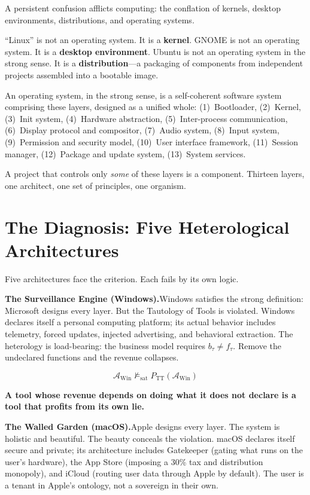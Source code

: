 \documentclass[11pt, oneside]{article}
\newcommand{\verdict}[1]{%
    \vspace{10pt}%
    \begin{center}\textcolor{LogosGold}{\textbf{#1}}\end{center}%
    \vspace{10pt}%
}
\begin{document}
A persistent confusion afflicts computing: the conflation of
kernels, desktop environments, distributions, and operating systems.

``Linux'' is not an operating system. It is a \textbf{kernel}. GNOME is
not an operating system. It is a \textbf{desktop environment}. Ubuntu is
not an operating system in the strong sense. It is a
\textbf{distribution}---a packaging of components from
independent projects assembled into a bootable image.

An operating system, in the strong sense, is a self-coherent
software system comprising these layers, designed as a unified whole: (1)~Bootloader, (2)~Kernel, (3)~Init
system, (4)~Hardware abstraction, (5)~Inter-process communication,
(6)~Display protocol and compositor, (7)~Audio system, (8)~Input system,
(9)~Permission and security model, (10)~User interface framework,
(11)~Session manager, (12)~Package and update system, (13)~System
services.

A project that controls only \textit{some} of these layers is a
component. Thirteen layers, one architect, one set of principles, one
organism.

\section{The Diagnosis: Five Heterological Architectures}

Five architectures face the criterion. Each fails by its own logic.

\medskip
\noindent\textbf{The Surveillance Engine (Windows).}\quad Windows
satisfies the strong definition: Microsoft designs every layer. But the
Tautology of Tools is violated. Windows declares itself a personal computing platform; its actual behavior
includes telemetry, forced updates, injected advertising, and behavioral
extraction. The heterology is load-bearing: the business model
requires $b_\tau \neq f_\tau$. Remove the undeclared functions and the
revenue collapses.

\[
\mathcal{A}_{\mathrm{Win}} \not\models_{\mathrm{sat}}
P_{\mathrm{TT}}(\mathcal{A}_{\mathrm{Win}}) \tag{TT}
\]

\verdict{A tool whose revenue depends on doing what it does not declare
is a tool that profits from its own lie.}

\noindent\textbf{The Walled Garden (macOS).}\quad Apple designs every
layer. The system is holistic and beautiful. The beauty
conceals the violation. macOS declares itself secure and private; its
architecture includes Gatekeeper (gating what runs on the user's
hardware), the App Store (imposing a 30\% tax and distribution
monopoly), and iCloud (routing user data through Apple by default). The user is a tenant in
Apple's ontology, not a sovereign in their own.
\end{document}
